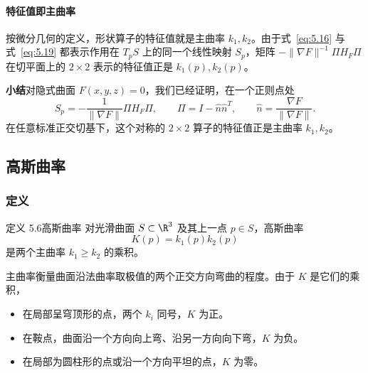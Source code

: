 \paragraph{特征值即主曲率}
按微分几何的定义，形状算子的特征值就是主曲率 $k_1,k_2$。由于式~\eqref{eq:5.16} 与式~\eqref{eq:5.19} 都表示作用在 $T_pS$ 上的同一个线性映射 $S_p$，矩阵 $-\lVert\nabla F\rVert^{-1}\Pi H_F\Pi$ 在切平面上的 $2\times2$ 表示的特征值正是 $k_1(p),k_2(p)$。

\textbf{小结}\quad 对隐式曲面 $F(x,y,z)=0$，我们已经证明，在一个正则点处
\[
  S_p=-\frac{1}{\lVert\nabla F\rVert}\Pi H_F\Pi,\qquad
  \Pi=I-\hat n\hat n^T,\qquad
  \hat n=\frac{\nabla F}{\lVert\nabla F\rVert}.
\]
在任意标准正交切基下，这个对称的 $2\times2$ 算子的特征值正是主曲率 $k_1,k_2$。

\subsection{高斯曲率}
\subsubsection{定义}
\begin{statement}{定义 5.6}{高斯曲率}
对光滑曲面 $S\subset\R^3$ 及其上一点 $p\in S$，高斯曲率
\[
  K(p)=k_1(p)k_2(p)
\]
是两个主曲率 $k_1\ge k_2$ 的乘积。

主曲率衡量曲面沿法曲率取极值的两个正交方向弯曲的程度。由于 $K$ 是它们的乘积，
\begin{itemize}
  \item 在局部呈穹顶形的点，两个 $k_i$ 同号，$K$ 为正。
  \item 在鞍点，曲面沿一个方向向上弯、沿另一方向向下弯，$K$ 为负。
  \item 在局部为圆柱形的点或沿一个方向平坦的点，$K$ 为零。
\end{itemize}
\end{statement}


